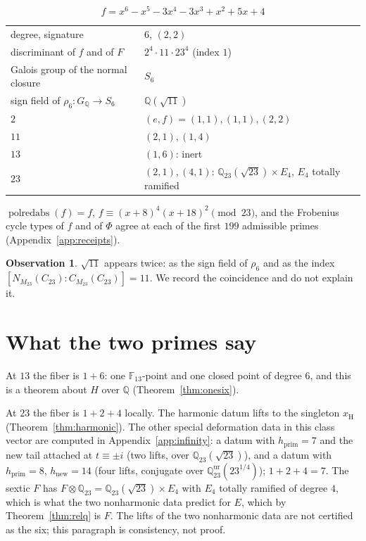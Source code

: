 \documentclass[11pt]{amsart}
\newcommand{\QQ}{\mathbb{Q}}
\newcommand{\FF}{\mathbb{F}}
\newcommand{\GQ}{G_{\QQ}}
\newcommand{\Mtw}{M_{23}}
\newcommand{\xH}{x_{\mathrm H}}
\newcommand{\sextic}{x^6-x^5-3x^4-3x^3+x^2+5x+4}
\theoremstyle{plain}
\theoremstyle{definition}
\newtheorem{observation}[theorem]{Observation}
\begin{document}
\[
  f=\sextic
\]
\begin{center}
\begin{tabular}{@{}ll@{}}
\toprule
degree, signature & $6$, $(2,2)$\\
discriminant of $f$ and of $F$ & $2^4\cdot11\cdot23^4$ (index $1$)\\
Galois group of the normal closure & $S_6$\\
sign field of $\rho_6\colon\GQ\to S_6$ & $\QQ(\sqrt{11})$\\
$2$ & $(e,f)=(1,1),(1,1),(2,2)$\\
$11$ & $(2,1),(1,4)$\\
$13$ & $(1,6)$: inert\\
$23$ & $(2,1),(4,1)$: $\QQ_{23}(\sqrt{23})\times E_4$, $E_4$ totally ramified\\
\bottomrule
\end{tabular}
\end{center}
$\operatorname{polredabs}(f)=f$, $f\equiv(x+8)^4(x+18)^2\pmod{23}$,
and the Frobenius cycle types of $f$ and of $\Phi$ agree at each of the
first $199$ admissible primes (Appendix~\ref{app:receipts}).

\begin{observation}
$\sqrt{11}$ appears twice: as the sign field of $\rho_6$ and as
the index $[N_{\Mtw}(C_{23}):C_{\Mtw}(C_{23})]=11$. We record the coincidence and
do not explain it.
\end{observation}

\section{What the two primes say}\label{sec:primes}

At $13$ the fiber is $1+6$: one $\FF_{13}$-point and one closed point
of degree $6$, and this is a theorem about $H$ over $\QQ$
(Theorem~\ref{thm:onesix}).

At $23$ the fiber is $1+2+4$ locally. The harmonic datum lifts to the
singleton $\xH$ (Theorem~\ref{thm:harmonic}). The other special
deformation data in this class vector are computed in
Appendix~\ref{app:infinity}: a datum with $h_{\mathrm{prim}}=7$ and
the new tail attached at $t\equiv\pm i$ (two lifts, over
$\QQ_{23}(\sqrt{23})$), and a datum with $h_{\mathrm{prim}}=8$,
$h_{\mathrm{new}}=14$ (four lifts, conjugate over
$\QQ_{23}^{\mathrm{ur}}(23^{1/4})$); $1+2+4=7$. The sextic $F$ has
$F\otimes\QQ_{23}=\QQ_{23}(\sqrt{23})\times E_4$ with $E_4$ totally
ramified of degree $4$, which is what the two nonharmonic data predict
for $E$, which by Theorem~\ref{thm:relq} is $F$. The lifts of the two
nonharmonic data are not certified as the six; this paragraph is
consistency, not proof.
\end{document}
